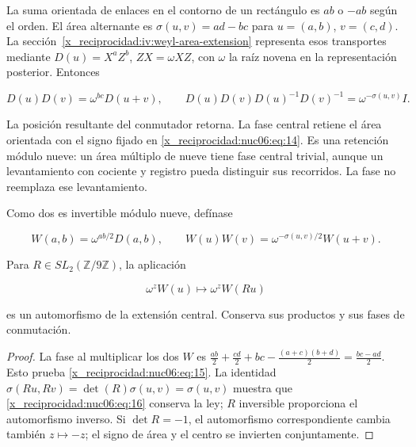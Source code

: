 La suma orientada de enlaces en el contorno de un rectángulo es \(ab\) o \(-ab\) según el orden. El área alternante es \(\sigma(u,v)=ad-bc\) para \(u=(a,b)\), \(v=(c,d)\). La sección~\ref{x_reciprocidad:iv:weyl-area-extension} representa esos transportes mediante \(D(u)=X^aZ^b\), \(ZX=\omega XZ\), con \(\omega\) la raíz novena en la representación posterior. Entonces

\begin{equation}
D(u)D(v)=\omega^{bc}D(u+v),\qquad
D(u)D(v)D(u)^{-1}D(v)^{-1}=\omega^{-\sigma(u,v)}I.
\label{x_reciprocidad:nuc06:eq:14}
\end{equation}

La posición resultante del conmutador retorna. La fase central retiene el área orientada con el signo fijado en \eqref{x_reciprocidad:nuc06:eq:14}. Es una retención módulo nueve: un área múltiplo de nueve tiene fase central trivial, aunque un levantamiento con cociente y registro pueda distinguir sus recorridos. La fase no reemplaza ese levantamiento.

\begin{proposition}

Como dos es invertible módulo nueve, defínase

\begin{equation}
W(a,b)=\omega^{ab/2}D(a,b),\qquad
W(u)W(v)=\omega^{-\sigma(u,v)/2}W(u+v).
\label{x_reciprocidad:nuc06:eq:15}
\end{equation}

Para \(R\in SL_2(\mathbb Z/9\mathbb Z)\), la aplicación

\begin{equation}
\omega^zW(u)\longmapsto\omega^zW(Ru)
\label{x_reciprocidad:nuc06:eq:16}
\end{equation}

es un automorfismo de la extensión central. Conserva sus productos y sus fases de conmutación.
\end{proposition}

\begin{proof}
La fase al multiplicar los dos \(W\) es
\(\frac{ab}{2}+\frac{cd}{2}+bc-\frac{(a+c)(b+d)}2=\frac{bc-ad}{2}\). Esto prueba \eqref{x_reciprocidad:nuc06:eq:15}. La identidad \(\sigma(Ru,Rv)=\det(R)\sigma(u,v)=\sigma(u,v)\) muestra que \eqref{x_reciprocidad:nuc06:eq:16} conserva la ley; \(R\) inversible proporciona el automorfismo inverso. Si \(\det R=-1\), el automorfismo correspondiente cambia también \(z\mapsto-z\); el signo de área y el centro se invierten conjuntamente.
\end{proof}

